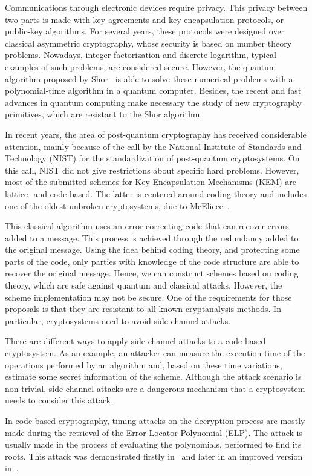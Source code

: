 Communications through electronic devices require privacy. This privacy between two parts is made with key agreements and key encapsulation protocols, or public-key algorithms. For several years, these protocols were designed over classical asymmetric cryptography, whose security is based on number theory problems. Nowadays, integer factorization and discrete logarithm, typical examples of such problems, are considered secure. However, the quantum algorithm proposed by Shor~\cite{shor1999polynomial} is able to solve these numerical problems with a polynomial-time algorithm in a quantum computer. Besides, the recent and fast advances in quantum computing make necessary the study of new cryptography primitives, which are resistant to the Shor algorithm. 

In recent years, the area of post-quantum cryptography has received considerable attention, mainly because of the call by the National Institute of Standards and Technology (NIST) for the standardization of post-quantum cryptosystems. On this call, NIST did not give restrictions about specific hard problems. However, most of the submitted schemes for Key Encapsulation Mechanisms (KEM) are lattice- and code-based. The latter is centered around coding theory and includes one of the oldest unbroken cryptosystems, due to McEliece~\cite{mceliece1978public}.

This classical algorithm uses an error-correcting code that can recover errors added to a message. This process is achieved through the redundancy added to the original message. Using the idea behind coding theory, and protecting some parts of the code, only parties with knowledge of the code structure are able to recover the original message. Hence, we can construct schemes based on coding theory, which are safe against quantum and classical attacks. However, the scheme implementation may not be secure. One of the requirements for those proposals is that they are resistant to all known cryptanalysis methods. In particular, cryptosystems need to avoid side-channel attacks.

There are different ways to apply side-channel attacks to a code-based cryptosystem. As an example, an attacker can measure the execution time of the operations performed by an algorithm and, based on these time variations, estimate some secret information of the scheme. Although the attack scenario is non-trivial, side-channel attacks are a dangerous mechanism that a cryptosystem needs to consider this attack.
 
In code-based cryptography, timing attacks on the decryption process are mostly made during the retrieval of the Error Locator Polynomial (ELP). The attack is usually made in the process of evaluating the polynomials, performed to find its roots. This attack was demonstrated firstly in~\cite{shoufan2009timing} and later in an improved version in~\cite{bucerzan2017improved}.

